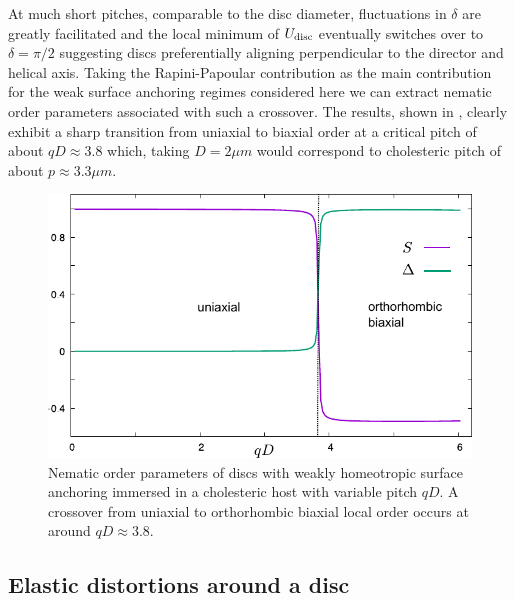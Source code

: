  At much short pitches,  comparable to the disc diameter, fluctuations in $\delta$ are greatly facilitated and the local minimum of $U_{\rm disc}$ eventually switches over to $\delta = \pi/2$ suggesting  discs  preferentially aligning perpendicular to the director and helical axis.  Taking the Rapini-Papoular contribution  as the main contribution for the weak surface anchoring regimes considered here we can extract  nematic order parameters associated with such a crossover.  The results, shown in , clearly exhibit a sharp transition from uniaxial to biaxial order at a critical pitch of about $qD \approx 3.8$ which, taking $D =2 \mu m$ would correspond to cholesteric pitch of about $p \approx 3.3 \mu m$.



\begin{figure}
	\includegraphics[width =  .8\columnwidth]{figures/chapter-3/discubx}
	\caption{Nematic order parameters of discs with weakly homeotropic surface anchoring immersed in a cholesteric host with variable pitch $qD$. A crossover from uniaxial to orthorhombic biaxial local order occurs at around $qD \approx 3.8$.  }
	\label{disop}
\end{figure}



\subsection{Elastic distortions around a disc}

